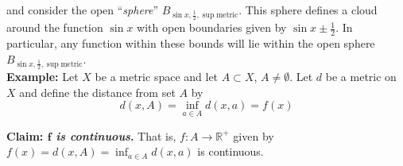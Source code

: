\documentclass[12pt]{article}
\newcommand{\R}{\mathbb R}
\begin{document}
and consider the open ``{\em sphere}'' $B_{\sin x, \frac{1}{2}, \sup \text{metric} }$. This sphere defines a cloud around the function $\sin x$ with open boundaries given by $\sin x \pm \frac{1}{2}$. In particular, any function within these bounds will lie within the open sphere $B_{\sin x, \frac{1}{2}, \sup \text{metric} }$. \\

%
%
{\bf Example:} Let $X$ be a metric space and let $A \subset X$, $A \neq \emptyset$. Let $d$ be a metric on $X$ and define the distance from set $A$ by
\begin{equation*}
	d(x, A) = \inf_{a\in A} d(x, a) = f(x)
\end{equation*}

%
% 
{\bf Claim: {\em $\bm f$ is continuous}.} That is, $f:A\to\R^+$ given by $f(x) = d(x,A) = \inf_{a\in A} d(x,a)$ is continuous.
\end{document}
